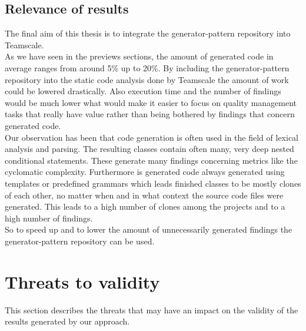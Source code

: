 \subsection{Relevance of results}
The final aim of this thesis is to integrate the generator-pattern repository into Teamscale. \\
As we have seen in the previews sections, the amount of generated code in average ranges from around 5\% up to 20\%. By including the generator-pattern repository into the static code analysis done by Teamscale the amount of work could be lowered drastically. Also execution time and the number of findings would be much lower what would make it easier to focus on quality management tasks that really have value rather than being bothered by findings that concern generated code.\\
Our observation has been that code generation is often used in the field of lexical analysis and parsing. The resulting classes contain often many, very deep nested conditional statements. These generate many findings concerning metrics like the cyclomatic complexity. Furthermore is generated code always generated using templates or predefined grammars which leads finished classes to be mostly clones of each other, no matter when and in what context the source code files were generated. This leads to a high number of clones among the projects and to a high number of findings.\\
So to speed up and to lower the amount of unnecessarily generated findings the generator-pattern repository can be used.

\section{Threats to validity}
This section describes the threats that may have an impact on the validity of the results generated by our approach.

